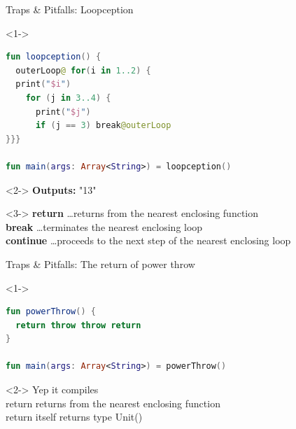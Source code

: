 \begin{frame}[fragile]{Traps \& Pitfalls: Loopception}
	\begin{overlayarea}{\textwidth}{\textheight}
		\begin{onlyenv}<1->
\begin{lstlisting}[language=Kotlin]
fun loopception() {
  outerLoop@ for(i in 1..2) {
  print("$i")
    for (j in 3..4) {
      print("$j")
      if (j == 3) break@outerLoop
}}}

fun main(args: Array<String>) = loopception()
\end{lstlisting}
		\end{onlyenv}
		\begin{onlyenv}<2->
			\textbf{Outputs:} "13"\\\vspace{\baselineskip}
		\end{onlyenv}
		\begin{onlyenv}<3->
			\textbf{return} \dots returns from the nearest enclosing function\\
			\textbf{break} \dots terminates the nearest enclosing loop\\
			\textbf{continue} \dots proceeds to the next step of the nearest enclosing loop
		\end{onlyenv}
	\end{overlayarea}
\end{frame}


\begin{frame}[fragile]{Traps \& Pitfalls: The return of power throw}
	\begin{overlayarea}{\textwidth}{.5\textheight}
		\begin{onlyenv}<1->
\begin{lstlisting}[language=Kotlin]
fun powerThrow() {
  return throw throw return
}

fun main(args: Array<String>) = powerThrow()
\end{lstlisting}
		\end{onlyenv}
		\begin{onlyenv}<2->
			Yep it compiles\\
			return returns from the nearest enclosing function\\
			return itself returns type Unit()
		\end{onlyenv}
	\end{overlayarea}
\end{frame}

